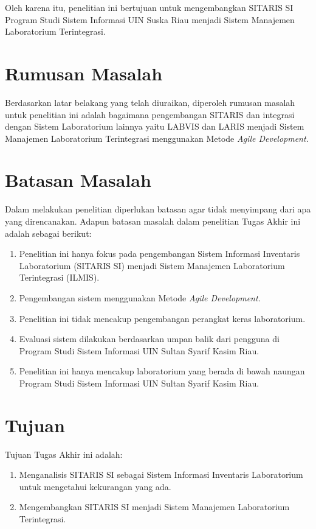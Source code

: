 Oleh karena itu, penelitian ini bertujuan untuk mengembangkan SITARIS SI Program Studi Sistem Informasi UIN Suska Riau menjadi Sistem Manajemen Laboratorium Terintegrasi.
\section{Rumusan Masalah}
Berdasarkan latar belakang yang telah diuraikan, diperoleh rumusan masalah untuk penelitian ini adalah bagaimana pengembangan SITARIS dan integrasi dengan Sistem Laboratorium lainnya yaitu LABVIS dan LARIS menjadi Sistem Manajemen Laboratorium Terintegrasi menggunakan Metode \textit{Agile Development}.

\section{Batasan Masalah}
Dalam melakukan penelitian diperlukan batasan agar tidak menyimpang dari apa yang direncanakan. Adapun batasan masalah dalam penelitian Tugas Akhir ini adalah sebagai berikut:
\begin{enumerate}
	\item Penelitian ini hanya fokus pada pengembangan Sistem Informasi Inventaris Laboratorium (SITARIS SI) menjadi Sistem Manajemen Laboratorium Terintegrasi (ILMIS).
	\item Pengembangan sistem menggunakan Metode \textit{Agile Development}.
	\item Penelitian ini tidak mencakup pengembangan perangkat keras laboratorium.
	\item Evaluasi sistem dilakukan berdasarkan umpan balik dari pengguna di Program Studi Sistem Informasi UIN Sultan Syarif Kasim Riau.
	\item Penelitian ini hanya mencakup laboratorium yang berada di bawah naungan Program Studi Sistem Informasi UIN Sultan Syarif Kasim Riau.
\end{enumerate}

\section{Tujuan}
Tujuan Tugas Akhir ini adalah:
\begin{enumerate}
	\item Menganalisis SITARIS SI sebagai Sistem Informasi Inventaris Laboratorium untuk mengetahui kekurangan yang ada.
	\item Mengembangkan SITARIS SI menjadi Sistem Manajemen Laboratorium Terintegrasi.
\end{enumerate}

